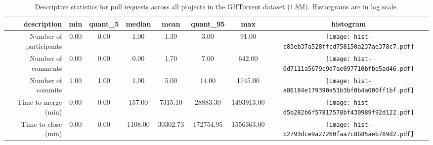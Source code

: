 \begin{table*}[ht]
\centering
\begin{tabular}{rccccccc}
  \hline
description & min & quant\_5 & median & mean & quant\_95 & max & histogram \\ 
  \hline
Number of participants & 0.00 & 0.00 & 1.00 & 1.39 & 3.00 & 91.00 & \texttt{[image: hist-c83eb37a528ffcd758150a237ae378c7.pdf]} \\ 
  Number of comments & 0.00 & 0.00 & 0.00 & 1.70 & 7.00 & 642.00 & \texttt{[image: hist-0d7111a5679c9d7ae097710bfbe5ad46.pdf]} \\ 
  Number of commits & 1.00 & 1.00 & 1.00 & 5.00 & 14.00 & 1745.00 & \texttt{[image: hist-a86184e179390a51b3bf0b4a000ff1bf.pdf]} \\ 
  Time to merge (min) & 0.00 & 0.00 & 157.00 & 7315.10 & 28883.30 & 1493913.00 & \texttt{[image: hist-d5b282b6f57817578bf430989f92d122.pdf]} \\ 
  Time to close (min) & 0.00 & 0.00 & 1108.00 & 30302.73 & 172754.95 & 1556363.00 & \texttt{[image: hist-b2793dce9a27260faa7c8b85aeb789d2.pdf]} \\ 
   \hline
\end{tabular}
\caption{Descriptive statistics for pull requests across all projects in the GHTorrent dataset (1.8M). Historgrams are in log scale.} 
\label{tab.overall.stats}
\end{table*}
